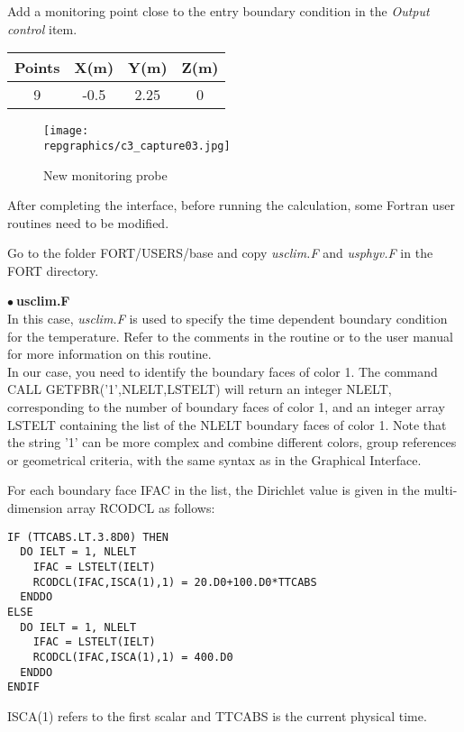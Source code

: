\newpage
Add a monitoring point close to the entry boundary condition in the
{\itshape Output control} item.

\begin{center}
\begin{tabular}{|c|c|c|c|}
\hline
Points & X(m) & Y(m) & Z(m)\\
\hline
9 & -0.5 & 2.25 & 0 \\
\hline
\end{tabular}
\end{center}

\begin{figure}[h!]
\begin{center}
\texttt{[image: \\repgraphics/c3\_capture03.jpg]}
\caption{New monitoring probe}
\label{fig3_e3}
\end{center}
\end{figure}


\newpage
After completing the interface, before running the calculation,
some Fortran user routines need to be modified.

Go to the folder FORT/USERS/base and copy {\itshape usclim.F} and
{\itshape usphyv.F} in the FORT directory.

$\bullet\ $\textbf{usclim.F}\\
In this case, {\itshape usclim.F} is used to specify the time dependent boundary
condition for
the temperature. Refer to the comments in the routine or to the \CS user manual
for more information on this routine.\\
In our case, you need to identify the boundary faces of color 1. The command\\
CALL GETFBR('1',NLELT,LSTELT)
will return an integer NLELT, corresponding to the number of boundary faces of
color 1, and an integer array LSTELT containing the list of the NLELT boundary
faces of color 1. Note that the string '1' can be more complex and combine
different colors, group references or geometrical criteria, with the same syntax
as in the Graphical Interface.

For each boundary face IFAC in the list, the Dirichlet value is given in the
multi-dimension array RCODCL as follows:
\begin{verbatim}
IF (TTCABS.LT.3.8D0) THEN
  DO IELT = 1, NLELT
    IFAC = LSTELT(IELT)
    RCODCL(IFAC,ISCA(1),1) = 20.D0+100.D0*TTCABS
  ENDDO
ELSE
  DO IELT = 1, NLELT
    IFAC = LSTELT(IELT)
    RCODCL(IFAC,ISCA(1),1) = 400.D0
  ENDDO
ENDIF
\end{verbatim}
ISCA(1) refers to the first scalar and TTCABS is the current physical time.

